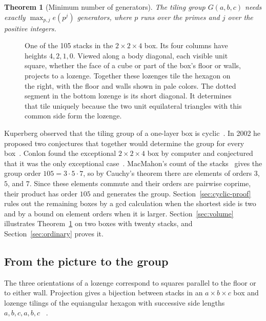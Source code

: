 \documentclass[11pt]{article}
\newtheorem{theorem}{Theorem}
\begin{document}
\begin{theorem}[Minimum number of generators]\label{thm:generators}
The tiling group \(G(a,b,c)\) needs exactly \(\max_{p,j} e(p^j)\)
generators, where \(p\) runs over the primes and \(j\) over the positive integers.
\end{theorem}

\enlargethispage{1.1\baselineskip}
\begin{figure}[H]
\centering\StackAndTiling
\caption{One of the 105 stacks in the \(2\times2\times4\) box. Its
four columns have heights \(4,2,1,0\). Viewed along a body diagonal,
each visible unit square, whether the face
of a cube or part of the box's floor or walls, projects to a lozenge.
Together these lozenges tile the hexagon on the right, with the floor
and walls shown in pale colors. The dotted segment in the bottom
lozenge is its short diagonal. It determines that tile uniquely because
the two unit equilateral triangles with this common side form the lozenge.}
\label{fig:stack}
\end{figure}

Kuperberg observed that the tiling group of a one-layer box is
cyclic~\cite[Question~2]{Kuperberg1998}. In 2002 he proposed two
conjectures that together would determine the group for every
box~\cite[\S5.1, Conjectures~11--12]{Kuperberg}.
Conlon found the exceptional \(2\times2\times4\) box by computer and conjectured that it was the only
exceptional case~\cite[\S7]{Conlon}. MacMahon's count of the stacks~\cite[\S429]{MacMahon}
gives the group order \(105=3\cdot5\cdot7\), so by Cauchy's theorem there are
elements of orders \(3\), \(5\), and \(7\). Since these elements commute and
their orders are pairwise coprime, their product has order \(105\) and
generates the group.
Section~\ref{sec:cyclic-proof} rules out the remaining boxes by a gcd
calculation when the shortest side is two and by a bound on element
orders when it is larger.
Section~\ref{sec:volume} illustrates Theorem~\ref{thm:generators} on two
boxes with twenty stacks, and Section~\ref{sec:ordinary} proves it.

\subsection*{From the picture to the group}

The three orientations of a lozenge correspond to squares parallel to
the floor or to either wall. Projection gives a bijection
between stacks in an \(a\times b\times c\) box and lozenge tilings of
the equiangular hexagon with successive side lengths \(a,b,c,a,b,c\)%
~\cite[\S5.1, Fig.~10]{Kuperberg}.
\end{document}
